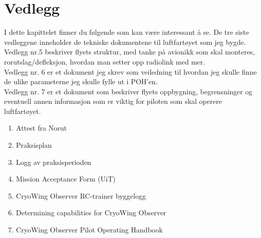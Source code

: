 \documentclass[12pt, a4paper]{article}
\begin{document}
\clearpage

\section{Vedlegg}
I dette kapittelet finner du følgende som kan være interessant å se. De tre siste vedleggene inneholder de tekniske dokumentene til luftfartøyet som jeg bygde. \\

Vedlegg nr.5 beskriver flyets struktur, med tanke på avionikk som skal monteres, rorutslag/defleksjon, hvordan man setter opp radiolink med mer. \\

Vedlegg nr. 6 er et dokument jeg skrev som veiledning til hvordan jeg skulle finne de ulike parameterne jeg skulle fylle ut i POH'en. \\

Vedlegg nr. 7 er et dokument som beskriver flyets oppbygning, begrensninger og eventuell annen informasjon som er viktig for piloten som skal operere luftfartøyet. 

\begin{enumerate}
	\item Attest fra Norut
	\item Praksisplan
	\item Logg av praksisperioden
	\item Mission Acceptance Form (UiT)
	\item CryoWing Observer RC-trainer byggelogg
	\item Determining capabilities for CryoWing Observer
	\item CryoWing Observer Pilot Operating Handbook
\end{enumerate}

\newpage
\end{document}
